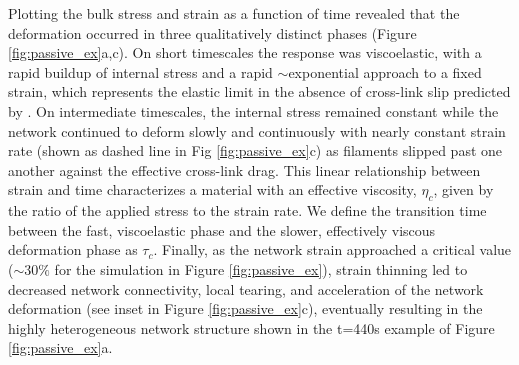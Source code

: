 \documentclass[10pt,letterpaper]{article}
\begin{document}
Plotting the bulk stress and strain as a function of time revealed that the deformation occurred in three qualitatively distinct phases (Figure \ref{fig:passive_ex}a,c). On short timescales the response was viscoelastic, with a rapid buildup of internal stress and a rapid $\sim$exponential approach to a fixed strain, which represents the elastic limit in the absence of cross-link slip predicted by \cite{theo_hlm}. On intermediate timescales, the internal stress remained constant while the network continued to deform slowly and continuously with nearly constant strain rate (shown as dashed line in Fig \ref{fig:passive_ex}c) as filaments slipped past one another against the effective cross-link drag. This linear relationship between strain and time characterizes a material with an effective viscosity, $\eta_c$, given by the ratio of the applied stress to the strain rate. We define the transition time between the fast, viscoelastic phase and the slower, effectively viscous deformation phase as $\tau_c$. Finally, as the network strain approached a critical value ($\sim 30\%$ for the simulation in Figure \ref{fig:passive_ex}), strain thinning led to decreased network connectivity, local tearing, and acceleration of the network deformation (see inset in Figure \ref{fig:passive_ex}c), eventually resulting in the highly heterogeneous network structure shown in the t=440s example of Figure \ref{fig:passive_ex}a. 
\end{document}
